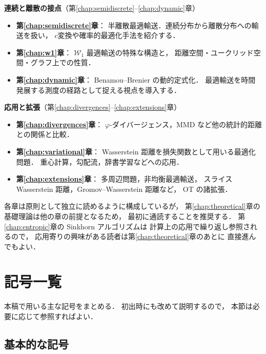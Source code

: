 \medskip

\noindent
\textbf{連続と離散の接点}（第\ref{chap:semidiscrete}--\ref{chap:dynamic}章）
\begin{itemize}
  \item \textbf{第\ref{chap:semidiscrete}章}：
    半離散最適輸送．連続分布から離散分布への輸送を扱い，
    $c$変換や確率的最適化手法を紹介する．
  \item \textbf{第\ref{chap:w1}章}：
    $\mathcal{W}_1$ 最適輸送の特殊な構造と，
    距離空間・ユークリッド空間・グラフ上での性質．
  \item \textbf{第\ref{chap:dynamic}章}：
    Benamou--Brenier の動的定式化．
    最適輸送を時間発展する測度の経路として捉える視点を導入する．
\end{itemize}

\medskip

\noindent
\textbf{応用と拡張}（第\ref{chap:divergences}--\ref{chap:extensions}章）
\begin{itemize}
  \item \textbf{第\ref{chap:divergences}章}：
    $\varphi$-ダイバージェンス，MMD など他の統計的距離との関係と比較．
  \item \textbf{第\ref{chap:variational}章}：
    Wasserstein 距離を損失関数として用いる最適化問題．
    重心計算，勾配流，辞書学習などへの応用．
  \item \textbf{第\ref{chap:extensions}章}：
    多周辺問題，非均衡最適輸送，
    スライス Wasserstein 距離，Gromov--Wasserstein 距離など，
    OT の諸拡張．
\end{itemize}

\medskip

各章は原則として独立に読めるように構成しているが，
第\ref{chap:theoretical}章の基礎理論は他の章の前提となるため，
最初に通読することを推奨する．
第\ref{chap:entropic}章の Sinkhorn アルゴリズムは
計算上の応用で繰り返し参照されるので，
応用寄りの興味がある読者は第\ref{chap:theoretical}章のあとに
直接進んでもよい．


\section{記号一覧}\label{sec:notation}

本稿で用いる主な記号をまとめる．
初出時にも改めて説明するので，
本節は必要に応じて参照すればよい．

\subsection*{基本的な記号}

